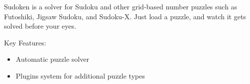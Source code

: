 \noindent
Sudoken is a solver for Sudoku and other grid-based number puzzles such as Futoshiki, Jigsaw Sudoku, and Sudoku-X. Just load a puzzle, and watch it gets solved before your eyes.

\medskip

\noindent
Key Features:
\begin{itemize}[topsep=0pt, partopsep=0pt]
\item Automatic puzzle solver 
\item Plugins system for additional puzzle types
\end{itemize}